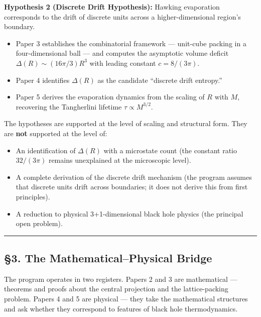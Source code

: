 \documentclass[a4paper,11pt]{article}
\theoremstyle{definition}
\providecommand{\tightlist}{\setlength{\itemsep}{0pt}\setlength{\parskip}{0pt}}
\begin{document}
\textbf{Hypothesis 2 (Discrete Drift Hypothesis):} Hawking evaporation
corresponds to the drift of discrete units across a higher-dimensional
region's boundary.

\begin{itemize}
\tightlist
\item
  Paper 3 establishes the combinatorial framework --- unit-cube packing
  in a four-dimensional ball --- and computes the asymptotic volume
  deficit \(\Delta(R) \sim (16\pi/3) R^3\) with leading constant
  \(c = 8/(3\pi)\).
\item
  Paper 4 identifies \(\Delta(R)\) as the candidate ``discrete drift
  entropy.''
\item
  Paper 5 derives the evaporation dynamics from the scaling of \(R\)
  with \(M\), recovering the Tangherlini lifetime
  \(\tau \propto M^{3/2}\).
\end{itemize}

The hypotheses are supported at the level of scaling and structural
form. They are \textbf{not} supported at the level of:

\begin{itemize}
\tightlist
\item
  An identification of \(\Delta(R)\) with a microstate count (the
  constant ratio \(32/(3\pi)\) remains unexplained at the microscopic
  level).
\item
  A complete derivation of the discrete drift mechanism (the program
  assumes that discrete units drift across boundaries; it does not
  derive this from first principles).
\item
  A reduction to physical 3+1-dimensional black hole physics (the
  principal open problem).
\end{itemize}

\begin{center}\rule{0.5\linewidth}{0.5pt}\end{center}

\subsection{§3. The Mathematical--Physical
Bridge}\label{the-mathematicalphysical-bridge}

The program operates in two registers. Papers 2 and 3 are mathematical
--- theorems and proofs about the central projection and the
lattice-packing problem. Papers 4 and 5 are physical --- they take the
mathematical structures and ask whether they correspond to features of
black hole thermodynamics.
\end{document}

